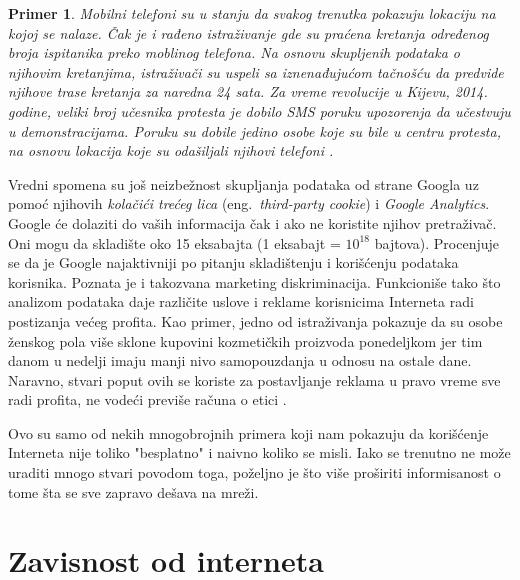 \documentclass[a4paper]{article}
\newtheorem{primer}{Primer}[section]
\begin{document}
\begin{primer}
	Mobilni telefoni su u stanju da svakog trenutka pokazuju lokaciju na kojoj se nalaze. Čak je i rađeno istraživanje gde su praćena kretanja određenog broja ispitanika preko moblinog telefona. Na osnovu skupljenih podataka o njihovim kretanjima, istraživači su uspeli sa iznenađujućom tačnošću da predvide njihove trase kretanja za naredna 24 sata. Za vreme revolucije u Kijevu, 2014. godine, veliki broj učesnika protesta je dobilo SMS poruku upozorenja da učestvuju u demonstracijama. Poruku su dobile jedino osobe koje su bile u centru protesta, na osnovu lokacija koje su odašiljali njihovi telefoni \cite{dataAndGoliath}.
\end{primer}

	Vredni spomena su još neizbežnost skupljanja podataka od strane Googla uz pomoć njihovih {\em kolačići trećeg lica} (eng.~{\em third-party cookie}) i \textit{Google Analytics}. Google će dolaziti do vaših informacija čak i ako ne koristite njihov pretraživač. Oni mogu da skladište oko 15 eksabajta (1 eksabajt = $10^{18}$ bajtova). Procenjuje se da je Google najaktivniji po pitanju skladištenju i korišćenju podataka korisnika. Poznata je i takozvana marketing diskriminacija. Funkcioniše tako što analizom podataka daje različite uslove i reklame korisnicima Interneta radi postizanja većeg profita. Kao primer, jedno od istraživanja pokazuje da su osobe ženskog pola više sklone kupovini kozmetičkih proizvoda ponedeljkom jer tim danom u nedelji imaju manji nivo samopouzdanja u odnosu na ostale dane. Naravno, stvari poput ovih se koriste za postavljanje reklama u pravo vreme sve radi profita, ne vodeći previše računa o etici \cite{dataAndGoliath}\cite{theNetDelusion}.

	Ovo su samo od nekih mnogobrojnih primera koji nam pokazuju da korišćenje Interneta nije toliko "besplatno" i naivno koliko se misli. Iako se trenutno ne može uraditi mnogo stvari povodom toga, poželjno je što više proširiti informisanost o tome šta se sve zapravo dešava na mreži.

\section{Zavisnost od interneta}
\end{document}
